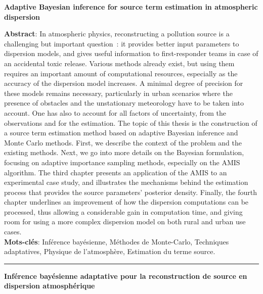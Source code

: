 \afterpage{\blankpage}

\thispagestyle{plain}

\begin{flushright}
\textbf{{ Adaptive Bayesian inference for source term estimation in atmospheric dispersion}}
\end{flushright}
{\small \textbf{Abstract}: In atmospheric physics, reconstructing a pollution source is a challenging but important question : it provides better input parameters to dispersion models, and gives useful information to first-responder teams in case of an accidental toxic release.
Various methods already exist, but using them requires an important amount of computational resources, especially as the accuracy of the dispersion model increases. A minimal degree of precision for these models remains necessary, particularly in urban scenarios where the presence of obstacles and the unstationary meteorology have to be taken into account. One has also to account for all factors of uncertainty, from the observations and for the estimation. 
The topic of this thesis is the construction of a source term estimation method based on adaptive Bayesian inference and Monte Carlo methods. First, we describe the context of the problem and the existing methods. Next, we go into more details on the Bayesian formulation, focusing on adaptive importance sampling methods, especially on the AMIS algorithm. The third chapter presents an application of the AMIS to an experimental case study, and illustrates the mechanisms behind the estimation process that provides the source parameters’ posterior density. Finally, the fourth chapter underlines an improvement of how the dispersion computations can be processed, thus allowing a considerable gain in computation time, and giving room for using a more complex dispersion model on both rural and urban use cases. \\

\textbf{Mots-clés}: Inférence bayésienne, Méthodes de Monte-Carlo, Techniques adaptatives, Physique de l'atmosphère, Estimation du terme source. \\

}
\rule{\linewidth}{.5pt}
\begin{flushright}
	\textbf{{Inférence bayésienne adaptative pour la reconstruction de source en dispersion atmosphérique}}
\end{flushright}
